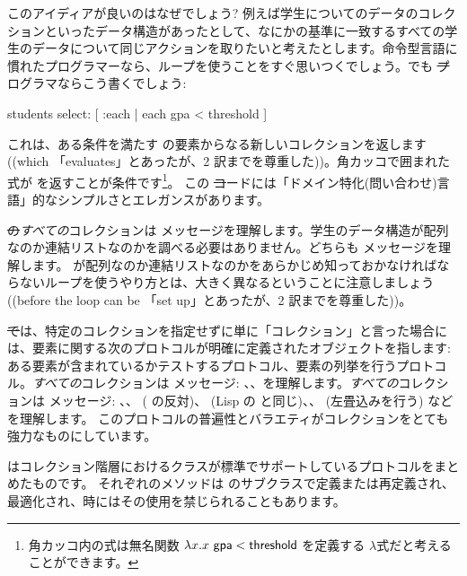 \documentclass[a4paper,10pt,twoside]{book}
\begin{document}
このアイディアが良いのはなぜでしょう?
例えば学生についてのデータのコレクションといったデータ構造があったとして、なにかの基準に一致するすべての学生のデータについて同じアクションを取りたいと考えたとします。命令型言語に慣れたプログラマーなら、ループを使うことをすぐ思いつくでしょう。でも \st プログラマならこう書くでしょう:
\begin{code}{}
students select: [ :each | each gpa < threshold ]
\end{code}
\noindent
これは、ある条件を満たす  の要素からなる新しいコレクションを返します((which 「evaluates」とあったが、2 訳までを尊重した))。角カッコで囲まれた式が  を返すことが条件です\footnote{角カッコ内の式は無名関数 $\lambda x. x~{\sf gpa} < {\sf threshold}$ を定義する $\lambda$式だと考えることができます。
}。
この \st コードには「ドメイン特化(問い合わせ)言語」的なシンプルさとエレガンスがあります。

\st の\emph{すべての}コレクションは メッセージを理解します。学生のデータ構造が配列なのか連結リストなのかを調べる必要はありません。どちらも  メッセージを理解します。  が配列なのか連結リストなのかをあらかじめ知っておかなければならないループを使うやり方とは、大きく異なるということに注意しましょう((before the loop can be 「set up」とあったが、2 訳までを尊重した))。

\st では、特定のコレクションを指定せずに単に「コレクション」と言った場合には、要素に関する次のプロトコルが明確に定義されたオブジェクトを指します: ある要素が含まれているかテストするプロトコル、要素の列挙を行うプロトコル。\emph{すべての}コレクションは  メッセージ: \mbox{、}\mbox{、}を理解します。\emph{すべての}コレクションは  メッセージ: 、、 ( の反対)、 (Lisp の と同じ)、、 (左畳込みを行う) などを理解します。
このプロトコルの普遍性とバラエティがコレクションをとても強力なものにしています。

 はコレクション階層におけるクラスが標準でサポートしているプロトコルをまとめたものです。
それぞれのメソッドは  のサブクラスで定義または再定義され、最適化され、時にはその使用を禁じられることもあります。
\end{document}
